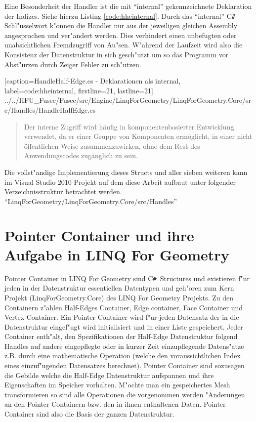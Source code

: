 \documentclass[pagesize, paper=a4, fontsize=12pt,titlepage=true, headings=small, headnosepline, abstractoff, liststotoc, nochapterprefix, plainheadsepline]{scrreprt}
\newcommand{\CSS}{C\texttt{\# }}
\newcommand{\LFG}{LINQ For Geometry}
\newcommand{\LFGS}{LINQ For Geometry }
\newcommand{\HES}{Half-Edge Datenstruktur }
\begin{document}
Eine Besonderheit der Handler ist die mit "`internal"' gekennzeichnete Deklaration der Indizes. Siehe hierzu Listing \ref{code:hheinternal}. Durch das "`internal"' \CSS Schl"usselwort k"onnen die Handler nur aus der jeweiligen gleichen Assembly angesprochen und ver"andert werden. Dies verhindert einen unbefugten oder unabsichtlichen Fremdzugriff von Au"sen. W"ahrend der Laufzeit wird also die Konsistenz der Datenstruktur in sich gesch"utzt um so das Programm vor Abst"urzen durch Zeiger Fehler zu sch"utzen.

			[caption={HandleHalf-Edge.cs - Deklarationen als internal}, label=code:hheinternal, firstline=21, lastline=21]
			{../../HFU_Fusee/Fusee/src/Engine/LinqForGeometry/LinqForGeometry.Core/src/Handles/HandleHalfEdge.cs}

\begin{quote}{\dq}Der interne Zugriff wird h{\"a}ufig in komponentenbasierter Entwicklung verwendet, da er einer Gruppe von Komponenten erm{\"o}glicht, in einer nicht {\"o}ffentlichen Weise zusammenzuwirken, ohne dem Rest des Anwendungscodes zug{\"a}nglich zu sein.{\dq} \cite{MicrosoftCReferenz.2013}\end{quote}


Die vollst"andige Implementierung dieses Structs und aller sieben weiteren kann im Visual Studio 2010 Projekt auf dem diese Arbeit aufbaut unter folgender Verzeichnisstruktur betrachtet werden. "`LinqForGeometry/LinqForGeometry.Core/src/Handles"'

\section {Pointer Container und ihre Aufgabe in \LFG}
		Pointer Container in \LFGS sind \CSS Structures und existieren f"ur jeden in der Datenstruktur essentiellen Datentypen und geh"oren zum Kern Projekt (LinqForGeometry.Core) des \LFGS Projekts. Zu den Containern z"ahlen Half-Edges Container, Edge container, Face Container und Vertex Container. Ein Pointer Container wird f"ur jeden Datensatz der in die Datenstruktur eingef"ugt wird initialisiert und in einer Liste gespeichert. Jeder Container enth"alt, den Spezifikationen der \HES folgend Handles auf andere eingepflegte oder in kurzer Zeit einzupflegende Datens"atze z.B. durch eine mathematische Operation (welche den voraussichtlichen Index eines einzuf"ugenden Datensatzes berechnet). Pointer Container sind sozusagen die Gebilde welche die Half-Edge Datenstruktur aufspannen und ihre Eigenschaften im Speicher vorhalten. M"ochte man ein gespeichertes Mesh transformieren so sind alle Operationen die vorgenommen werden "Anderungen an den Pointer Containern bzw. den in ihnen enthaltenen Daten. Pointer Container sind also die Basis der ganzen Datenstruktur.
\newline
\end{document}

